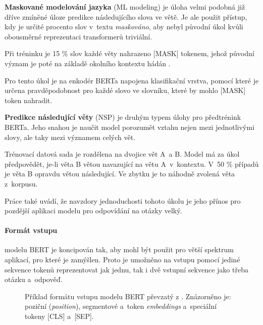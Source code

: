 \medskip
\textbf{Maskované modelování jazyka} (ML modeling) 
je úloha velmi podobná již dříve zmíněné úloze predikce následujícího slova ve větě. Je ale použit přístup, kdy je určité procento slov v~textu \emph{maskováno}, aby nebyl původní úkol kvůli obousměrné reprezentaci transformerů triviální.\par
Při tréninku je 15 \% slov každé věty nahrazeno [MASK] tokenem, jehož původní význam je poté na základě okolního kontextu hádán \cite{BERT}.\par
Pro tento úkol je na enkodér BERTa napojena klasifikační vrstva, pomocí které je určena pravděpodobnost pro každé slovo ve slovníku, které by mohlo [MASK] token nahradit.\par
\smallskip
\textbf{Predikce následující věty} (NSP) je druhým typem úlohy pro předtrénink BERTa. Jeho snahou je naučit model porozumět vztahu nejen mezi jednotlivými slovy, ale taky mezi významem celých vět.\par
Trénovací datová sada je rozdělena na dvojice vět A~a B. Model má za úkol předpovědět, je-li věta B větou navazující na větu A~v~kontextu. V~50 \% případů je věta B opravdu větou následující. Ve zbytku je to náhodně zvolená věta z~korpusu.\par
Práce \cite{BERT} také uvádí, že navzdory jednoduchosti tohoto úkolu je jeho přínos pro pozdější aplikaci modelu pro odpovídání na otázky velký.\par

\paragraph{Formát vstupu}
modelu BERT je koncipován tak, aby mohl být použit pro větší spektrum aplikací, pro které je zamýšlen. Proto je umožněno na vstupu pomocí jediné sekvence tokenů reprezentovat jak jednu, tak i dvě vstupní sekvence jako třeba otázku a~odpověď.

\begin{figure}[hbt]
	\centering
	\caption{Příklad formátu vstupu  modelu BERT převzatý z \cite{BERT}. Znázorněno je: poziční (\emph{position}), segmentové a~token \emph{embeddings} a~speciální tokeny [CLS] a~[SEP].}
	\label{bert_input}
\end{figure}

